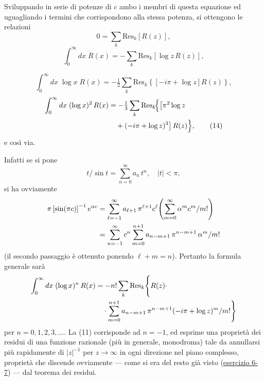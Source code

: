 \documentclass[11pt, a4paper]{book}
\numberwithin{equation}{section}
\begin{document}
Sviluppando in serie di potenze di $c$ ambo i membri di questa equazione
ed uguagliando i termini che corrispondono alla stessa potenza, si ottengono
le relazioni
\begin{equation}
    0 = \sum_k \mathrm{Res}_k\!\left[R(z)\right], \tag{11}
\end{equation}
\begin{equation}
    \int_0^\infty dx\; R(x) = -\sum_k \mathrm{Res}_k\!\left[\log z\, R(z)\right], \tag{12}
\end{equation}


\begin{equation}
    \int_0^\infty dx\; \log x\; R(x) = -\tfrac{1}{2}\sum_k \mathrm{Res}_k\!\left\{
    \left[-i\pi + \log z\right] R(z)\right\}, \tag{13}
\end{equation}
\begin{align}
    \int_0^\infty dx\;(\log x)^2\, R(x) &= -\tfrac{1}{3}\sum_k \mathrm{Res}_k\!\Bigl\{
    \bigl[\pi^2 \log z \notag\\
    &\quad + (-i\pi + \log z)^3\bigr]\, R(z)\Bigr\}, \tag{14}
\end{align}
e così via.

Infatti se si pone
\[
    t/\sin t = \sum_{n=0}^\infty a_n\, t^n, \quad |t| < \pi,
\]
si ha ovviamente
\begin{align}
    \pi\left[\sin(\pi c)\right]^{-1} e^{\alpha c}
    &= \sum_{\ell=-1}^\infty a_{\ell+1}\, \pi^{\ell+1} c^\ell
       \Biggl(\sum_{m=0}^\infty \alpha^m c^m / m!\Biggr) \notag\\
    &= \sum_{n=-1}^\infty c^n \sum_{m=0}^{n+1} a_{n-m+1}\, \pi^{n-m+1}\, \alpha^m / m!
\end{align}
(il secondo passaggio è ottenuto ponendo $\ell + m = n$). Pertanto la formula
generale sarà
\begin{align}
    \int_0^\infty dx\; (\log x)^n\, R(x) &= -n!\sum_k \mathrm{Res}_k\Biggl\{R(z)\cdot \notag\\
    &\quad \cdot \sum_{m=0}^{n+1} a_{n-m+1}\,\pi^{n-m+1}(-i\pi+\log z)^m / m!\Biggr\}
\end{align}
per $n = 0, 1, 2, 3, \ldots$\;. La (11) corrisponde ad $n = -1$, ed esprime una
proprietà dei residui di una funzione razionale (più in generale, monodroma)
tale da annullarsi più rapidamente di $|z|^{-1}$ per $z \to \infty$ in ogni
direzione nel piano complesso, proprietà che discende ovviamente --- come si
era del resto già visto (\underline{esercizio 6-7}) --- dal teorema dei residui.
\end{document}
